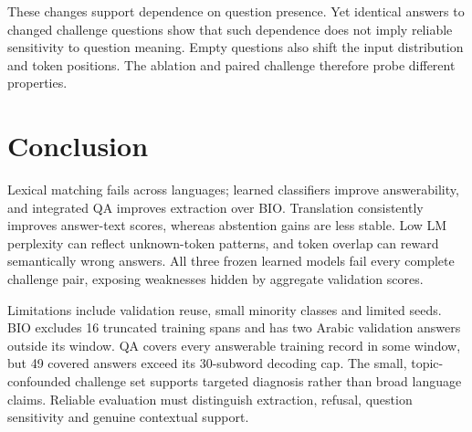 \documentclass[11pt]{article}
\begin{document}
These changes support dependence on question presence. Yet identical answers to changed challenge questions show that such dependence does not imply reliable sensitivity to question meaning. Empty questions also shift the input distribution and token positions. The ablation and paired challenge therefore probe different properties.

\balance
\section{Conclusion}
Lexical matching fails across languages; learned classifiers improve answerability, and integrated QA improves extraction over BIO. Translation consistently improves answer-text scores, whereas abstention gains are less stable. Low LM perplexity can reflect unknown-token patterns, and token overlap can reward semantically wrong answers. All three frozen learned models fail every complete challenge pair, exposing weaknesses hidden by aggregate validation scores.

Limitations include validation reuse, small minority classes and limited seeds. BIO excludes 16 truncated training spans and has two Arabic validation answers outside its window. QA covers every answerable training record in some window, but 49 covered answers exceed its 30-subword decoding cap. The small, topic-confounded challenge set supports targeted diagnosis rather than broad language claims. Reliable evaluation must distinguish extraction, refusal, question sensitivity and genuine contextual support.
\end{document}
